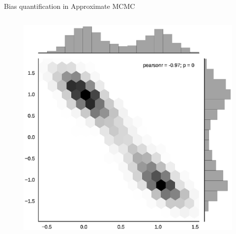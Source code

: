 \documentclass{beamer}
\begin{document}
\begin{frame}{Bias quantification in Approximate MCMC}
\begin{columns}
\begin{column}{.45\textwidth}
            \begin{figure}
           \includegraphics[width=\textwidth]{img/sgld_sample} 
        \end{figure}

        \end{column}
    \end{columns}
 \end{frame}
\end{document}
